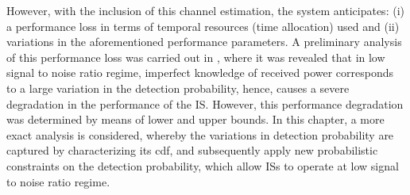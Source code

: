 However, with the inclusion of this channel estimation, the system anticipates: (i) a performance loss in terms of temporal resources (time allocation) used and (ii) variations in the aforementioned performance parameters. A preliminary analysis of this performance loss was carried out in \cite{Kaushik15_CC}, where it was revealed that in low signal to noise ratio regime, imperfect knowledge of received power corresponds to a large variation in the detection probability, hence, causes a severe degradation in the performance of the IS. However, this performance degradation was determined by means of lower and upper bounds. In this chapter, a more exact analysis is considered, whereby the variations in detection probability are captured by characterizing its cdf, and subsequently apply new probabilistic constraints on the detection probability, which allow ISs to operate at low signal to noise ratio regime. %



